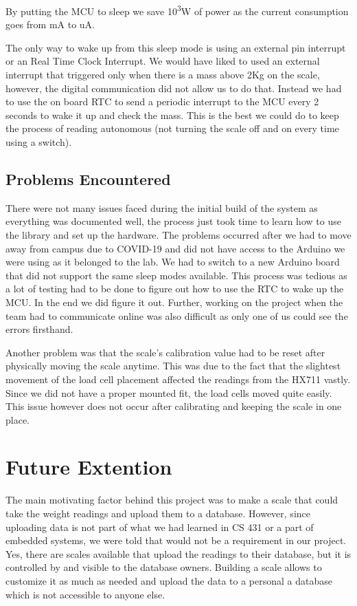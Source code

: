 \documentclass[10pt]{article}
\begin{document}
By putting the MCU to sleep we save 10\textsuperscript{3}W of power as the current consumption goes from mA to uA.

The only way to wake up from this sleep mode is using an external pin interrupt or an Real Time Clock Interrupt. We would have liked to used an external interrupt that triggered only when there is a mass above 2Kg on the scale, however, the digital communication did not allow us to do that. Instead we had to use the on board RTC to send a periodic interrupt to the MCU every 2 seconds to wake it up and check the mass. This is the best we could do to keep the process of reading autonomous (not turning the scale off and on every time using a switch).


\subsection{Problems Encountered}

There were not many issues faced during the initial build of the system as everything was documented well, the process just took time to learn how to use the library and set up the hardware. The problems occurred after we had to move away from campus due to COVID-19 and did not have access to the Arduino we were using as it belonged to the lab. We had to switch to a new Arduino board that did not support the same sleep modes available. This process was tedious as a lot of testing had to be done to figure out how to use the RTC to wake up the MCU. In the end we did figure it out. Further, working on the project when the team had to communicate online was also difficult as only one of us could see the errors firsthand.

Another problem was that the scale's calibration value had to be reset after physically moving the scale anytime. This was due to the fact that the slightest movement of the load cell placement affected the readings from the HX711 vastly. Since we did not have a proper mounted fit, the load cells moved quite easily. This issue however does not occur after calibrating and keeping the scale in one place.

\section{Future Extention}
The main motivating factor behind this project was to make a scale that could take the weight readings and upload them to a database. However, since uploading data is not part of what we had learned in CS 431 or a part of embedded systems, we were told that would not be a requirement in our project. Yes, there are scales available that upload the readings to their database, but it is controlled by and visible to the database owners. Building a scale allows to customize it as much as needed and upload the data to a personal a database which is not accessible to anyone else.
\end{document}
